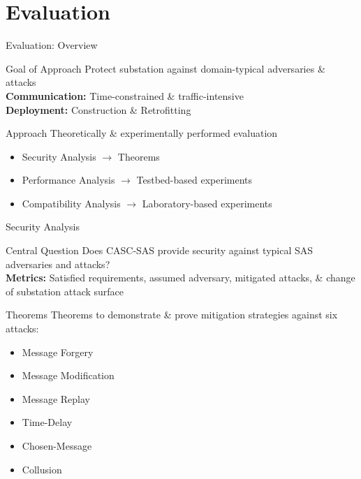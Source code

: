 \documentclass[en]{sdqbeamer}
\begin{document}
\section{Evaluation}
\begin{frame}{Evaluation: Overview}
    \begin{greenblock}{Goal of Approach}
        Protect substation against domain-typical adversaries \& attacks
        \\\textbf{Communication:} Time-constrained \& traffic-intensive
        \\\textbf{Deployment:} Construction \& Retrofitting
    \end{greenblock}
    \begin{blueblock}{Approach}
        Theoretically \& experimentally performed evaluation
        \begin{itemize}
            \item Security Analysis $\rightarrow$ Theorems
            \item Performance Analysis $\rightarrow$ Testbed-based experiments
            \item Compatibility Analysis $\rightarrow$ Laboratory-based experiments
        \end{itemize}
    \end{blueblock}
\end{frame}
\begin{frame}{Security Analysis}
    \begin{greenblock}{Central Question}
        Does CASC-SAS provide security against typical SAS adversaries and attacks?
        \\\textbf{Metrics:} Satisfied requirements, assumed adversary, mitigated attacks, \& change of substation attack surface
    \end{greenblock}
    \begin{blueblock}{Theorems}
        Theorems to demonstrate \& prove mitigation strategies against six attacks:
        \begin{itemize}
            \item Message Forgery
            \item Message Modification
            \item Message Replay
            \item Time-Delay
            \item Chosen-Message
            \item Collusion
        \end{itemize}
    \end{blueblock}
\end{frame}
\end{document}
